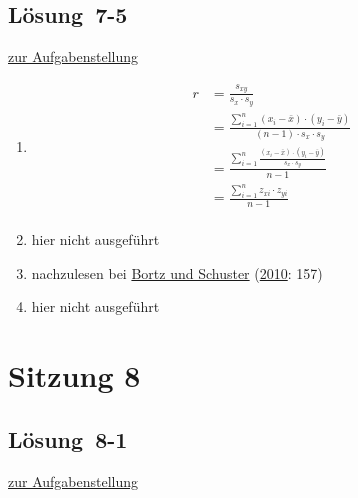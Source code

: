 \documentclass[
  11pt,
  ngerman,
  a4paper,
]{report}
\begin{document}
\hypertarget{loesung-7-5}{%
\subsection{Lösung~7-5}\label{loesung-7-5}}

\protect\hyperlink{aufgabe-7-5}{zur Aufgabenstellung}

\begin{enumerate}
\def\labelenumi{\alph{enumi})}
\item
  \[\begin{aligned}
    r&=\frac{s_{xy}}{s_x\cdot s_y}\\[6pt]
    &=\frac{\sum\limits^n_{i=1}(x_i-\bar{x})\cdot(y_i-\bar{y})}{(n-1)\cdot s_x \cdot s_y}\\[6pt]
    &=\frac{\sum\limits^n_{i=1}\frac{(x_i-\bar{x})\cdot(y_i-\bar{y})}{s_x\cdot s_y}}{n-1}\\[6pt]
    &=\frac{\sum\limits^n_{i=1}z_{xi}\cdot z_{yi}}{n-1}\\[6pt]
    \end{aligned}\]
\item
  hier nicht ausgeführt
\item
  nachzulesen bei \protect\hyperlink{ref-bortz}{Bortz und Schuster} (\protect\hyperlink{ref-bortz}{2010}: 157)
\item
  hier nicht ausgeführt
\end{enumerate}

\hypertarget{sitzung-8}{%
\section*{Sitzung 8}\label{sitzung-8}}

\hypertarget{loesung-8-1}{%
\subsection{Lösung~8-1}\label{loesung-8-1}}

\protect\hyperlink{aufgabe-8-1}{zur Aufgabenstellung}
\end{document}
